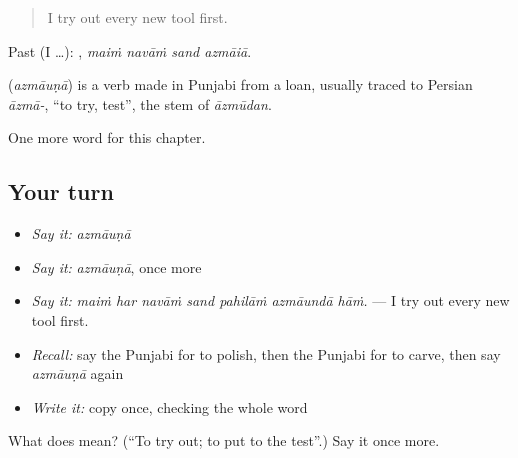 \begin{quote}
I try out every new tool first.
\end{quote}

Past (I …):    , \emph{maiṁ navāṁ sand azmāiā}.

\begin{cousinweb}
\textbf{} (\emph{azmāuṇā}) is a verb made in Punjabi from a loan, usually traced to Persian \emph{āzmā-}, \textquotedblleft{}to try, test\textquotedblright{}, the stem of \emph{āzmūdan}.
\end{cousinweb}

\begin{grammarlens}[title={What you've built}]
One more word for this chapter.
\end{grammarlens}

\subsection*{Your turn}
\begin{itemize}
\raggedright
  \item \emph{Say it:} \emph{azmāuṇā}
  \item \emph{Say it:} \emph{azmāuṇā}, once more
  \item \emph{Say it:} \emph{maiṁ har navāṁ sand pahilāṁ azmāundā hāṁ.} — I try out every new tool first.
  \item \emph{Recall:} say the Punjabi for to polish, then the Punjabi for to carve, then say \emph{azmāuṇā} again
  \item \emph{Write it:} copy \textbf{} once, checking the whole word
\end{itemize}

\begin{tcolorbox}[breakable,colback=teal!4,colframe=teal!35!black,title={Before you move on}]
What does  mean? (\textquotedblleft{}To try out; to put to the test\textquotedblright{}.) Say it once more.
\end{tcolorbox}
